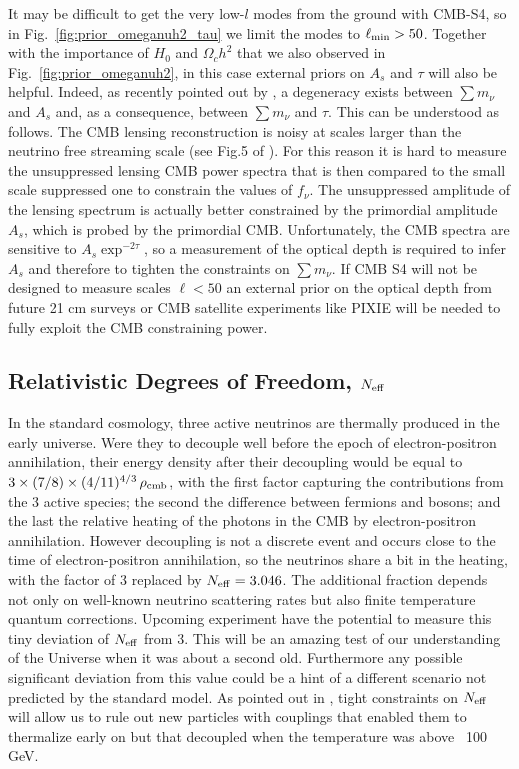 \documentclass[aps,prd,reprint,superscriptaddress]{revtex4-1}
\newcommand{\reffig}[1]{Fig.~\ref{fig:#1}}
\begin{document}
It may be difficult to get the very low-$l$ modes from the ground with CMB-S4, so in \reffig{prior_omeganuh2_tau} we limit the modes to $\ell_{\rm min}>50$. 
Together with the importance of $H_{0}$ and $\Omega_ch^2$ that we also observed in \reffig{prior_omeganuh2}, in this case external priors on $A_{s}$ and $\tau$ will also be helpful.
Indeed, as recently pointed out by \cite{allison:2015}, a degeneracy exists between $\sum m_\nu$ and $A_{s}$ and, as a consequence, between $\sum m_\nu$ and $\tau$. This can be understood as follows.
The CMB lensing reconstruction is noisy at scales larger than the neutrino free streaming scale (see Fig.5 of \cite{2013arXiv1309.5383A}). For this reason it is hard to measure the unsuppressed lensing CMB power spectra that is then compared to the small scale suppressed one to constrain the values of $f_{\nu}$. The unsuppressed amplitude of the lensing spectrum is actually better constrained by the primordial amplitude $A_{s}$, which is probed by the primordial CMB. Unfortunately, the CMB spectra are sensitive to $A_{s}\exp^{-2\tau}$, so 
a measurement of the optical depth is required to infer $A_{s}$ and therefore to tighten the constraints on $\sum m_\nu$. If CMB S4 will not be designed to measure scales $\ell<50$ an external prior on the optical depth from future 21 cm surveys \cite{liu:2015} or CMB satellite experiments like PIXIE \cite{kogut:2011} will be needed to fully exploit the CMB constraining power.

\subsection{Relativistic Degrees of Freedom, $N_{\rm eff}$}

In the standard cosmology, three active neutrinos are thermally produced in the early universe. Were they to decouple well before the epoch of electron-positron annihilation, their energy density after their decoupling would be equal to $3\times (7/8)\times (4/11)^{4/3}\,\rho_{\rm cmb}$, with the first factor capturing the contributions from the 3 active species; the second the difference between fermions and bosons; and the last the relative heating of the photons in the CMB by electron-positron annihilation. However decoupling is not a discrete event and occurs close to the time of electron-positron annihilation, so the neutrinos share a bit in the heating, with the factor of 3 replaced by $N_{\rm eff}=3.046$. The additional fraction depends not only on well-known neutrino scattering rates but also finite temperature quantum corrections. 
Upcoming experiment have the potential to measure this tiny deviation of $N_{\rm eff}$ from 3. This will be an amazing test of our understanding of the Universe when it was about a second old.
Furthermore any possible significant deviation from this value could be a hint of a different scenario not predicted by the standard model. As pointed out in \cite{baumann:2015}, tight constraints on $N_{\rm eff}$ will allow us to rule out new particles with couplings that enabled them to thermalize early on but that decoupled when the temperature was above ~100 GeV.
\end{document}
